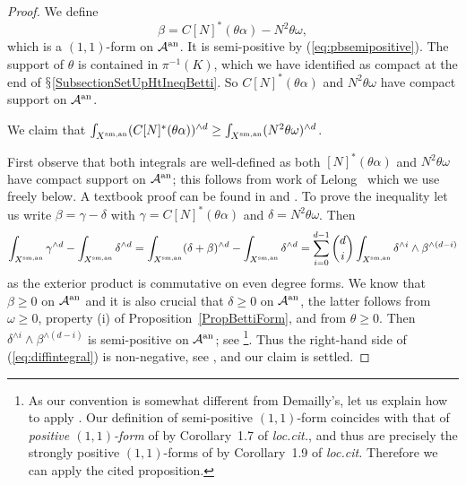 \begin{proof}
We define
\begin{equation*}
  \beta = C  [N]^*(\theta\alpha) - N^2\theta\omega,
\end{equation*}
which is a  $(1,1)$-form on ${\mathcal{A}}^{\mathrm{an}}$.
It is semi-positive by (\ref{eq:pbsemipositive}). 
The support of $\theta$ is
contained in $\pi^{-1}(K)$, which we have identified as compact at the
end of $\mathsection$\ref{SubsectionSetUpHtIneqBetti}.
So
$C[N]^*(\theta\alpha)$ and $N^2\theta\omega$ have compact support on ${\mathcal{A}}^{\mathrm{an}}$. %

We claim that  $\int_{{X}^{\mathrm{sm,an}}} (C[N]^*(\theta\alpha))^{\wedge d} \ge
\int_{{X}^{\mathrm{sm,an}}} (N^2 \theta\omega)^{\wedge d}$.

First observe that both integrals are well-defined as both
$[N]^*(\theta\alpha)$ and $N^2\theta\omega$ have compact support on
${\mathcal{A}}^{\mathrm{an}}$; this follows from work of Lelong~\cite{Lelong} which we
use freely below. A textbook proof can be found in
\cite[Theorem~11.21]{voisin:hodge1} and
\cite[$\mathsection$III.2.B]{Demailly}. 
To prove the inequality let us  write $\beta = \gamma - \delta$ with $\gamma = C[N]^*(\theta
\alpha)$ and $\delta = N^2\theta\omega$.
Then
\begin{equation}
\label{eq:diffintegral}  
  \int_{{X}^{\mathrm{sm,an}}} \gamma^{\wedge d} - \int_{{X}^{\mathrm{sm,an}}}\delta^{\wedge d}
  = 
\int_{{X}^{\mathrm{sm,an}}} (\delta+\beta)^{\wedge d} - \int_{{X}^{\mathrm{sm,an}}} \delta^{\wedge
    d}
= \sum_{i=0}^{d-1} {d \choose i} \int_{{X}^{\mathrm{sm,an}}} \delta^{\wedge
  i}\wedge \beta^{\wedge (d-i)}
\end{equation}
as the exterior product is commutative on even degree forms. 
We know that $\beta \ge 0$ on ${\mathcal{A}}^{\mathrm{an}}$ and it is also crucial that
$\delta \ge 0$ on ${\mathcal{A}}^{\mathrm{an}}$, the latter
follows from $\omega \ge 0$, property (i) of
Proposition~\ref{PropBettiForm},
and from $\theta\ge 0$.
Then $\delta^{\wedge i}\wedge \beta^{\wedge (d-i)}$ is semi-positive
on ${\mathcal{A}}^{\mathrm{an}}$; see \cite[Proposition~III.1.11]{Demailly}\footnote{As our convention  is somewhat different from Demailly's, let us explain how to apply  \cite[Proposition~III.1.11]{Demailly}. Our definition of semi-positive $(1,1)$-form coincides with that of \textit{positive $(1,1)$-form} of \cite[Chapter~III]{Demailly} by Corollary~1.7 of \textit{loc.cit.}, and thus are precisely the strongly positive $(1,1)$-forms of \cite[Chapter~III]{Demailly} by Corollary~1.9 of \textit{loc.cit.} Therefore we can apply the cited proposition.}. Thus the right-hand side of (\ref{eq:diffintegral}) is
 non-negative, see \cite[Theorem~III.2.7]{Demailly}, and our claim is settled.


\end{proof}
